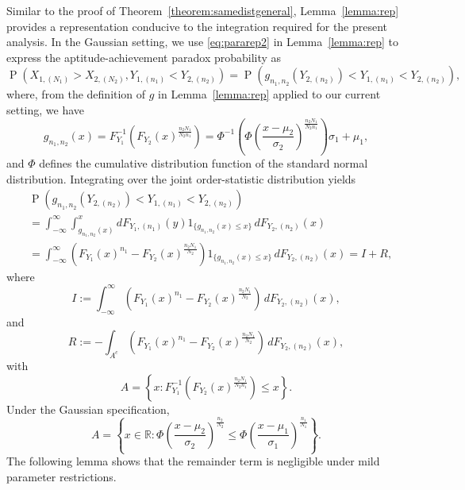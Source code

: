 \documentclass[12pt]{article}
\DeclareMathOperator*{\Prob}{P}
\begin{document}
Similar to the proof of Theorem~\ref{theorem:samedistgeneral}, Lemma~\ref{lemma:rep} provides a representation conducive to the integration required for the present analysis. In the Gaussian setting, we use \eqref{eq:pararep2} in Lemma~\ref{lemma:rep} to express the aptitude-achievement paradox probability as
$$
 \Prob\left(X_{1,(N_1)} > X_{2,(N_2)}, Y_{1,(n_1)} < Y_{2,(n_2)}\right) = \Prob\left( g_{n_1,n_2}\left(Y_{2,(n_2)}\right) < Y_{1,(n_1)}  < Y_{2,(n_2)}\right),
$$
where, from the definition of $g$ in Lemma~\ref{lemma:rep} applied to our current setting, we have 
\begin{equation} \label{eq:gnorm}
	  g_{n_1, n_2}(x) = F_{Y_1}^{-1}\left(F_{Y_2}(x)^{\frac{n_2N_1}{N_2n_1}}\right) = \Phi^{-1}\left(\Phi\left(\frac{x-\mu_2}{\sigma_2}\right)^\frac{n_2N_1}{N_2n_1}\right)\sigma_1 +\mu_1,
\end{equation}
and $\Phi$ defines the cumulative distribution function of the standard normal distribution. Integrating over the joint order-statistic distribution yields
\begin{align}
&\Prob\left(g_{n_1,n_2}(Y_{2,(n_2)}) < Y_{1,(n_1)} < Y_{2,(n_2)}\right) \\&= \int_{-\infty}^{\infty} \int_{g_{n_1, n_2}(x)}^{x}
   dF_{Y_1,(n_1)}(y) 1_{\{g_{n_1, n_2}(x) \leq x\}} \,dF_{Y_2,(n_2)}(x) \\
   &= \int_{-\infty}^{\infty} 
   \left(F_{Y_1}(x)^{n_1} - F_{Y_2}(x)^{\frac{n_2N_1}{N_2}}\right) 1_{\{g_{n_1, n_2}(x) \leq x\}}\,dF_{Y_2,(n_2)}(x)
	= I + R,
\label{eq:main-decomp}
\end{align}
where
\begin{equation} \label{eq:integral}
 I := \int_{-\infty}^{\infty} 
   \left(F_{Y_1}(x)^{n_1} - F_{Y_2}(x)^{\frac{n_2N_1}{N_2}}\right) \,dF_{Y_2,(n_2)}(x),
\end{equation}
and
\begin{equation} \label{eq:remainder}
  R := - \int_{A^c} 
    \left(F_{Y_1}(x)^{n_1}-F_{Y_2}(x)^{\frac{n_2N_1}{N_2}}\right) \,dF_{Y_2,(n_2)}(x),
\end{equation}
with
\begin{equation}\label{eq:A}
  A = \left\{x : F_{Y_1}^{-1} \!\left(F_{Y_2}(x)^{\frac{n_2N_1}{N_2n_1}}\right)
	\le x \right\}.
\end{equation}
Under the Gaussian specification,
$$
	A = \left\{ x \in \mathbb{R} : \Phi\!\left(\frac{x-\mu_2}
		{\sigma_2}\right)^{\frac{n_2}{N_2}} \le
	\Phi\!\left(\frac{x-\mu_1}{\sigma_1}\right)^{\frac{n_1}{N_1}}
	\right\}.
$$
The following lemma shows that the remainder term is negligible under mild parameter restrictions.
\end{document}
